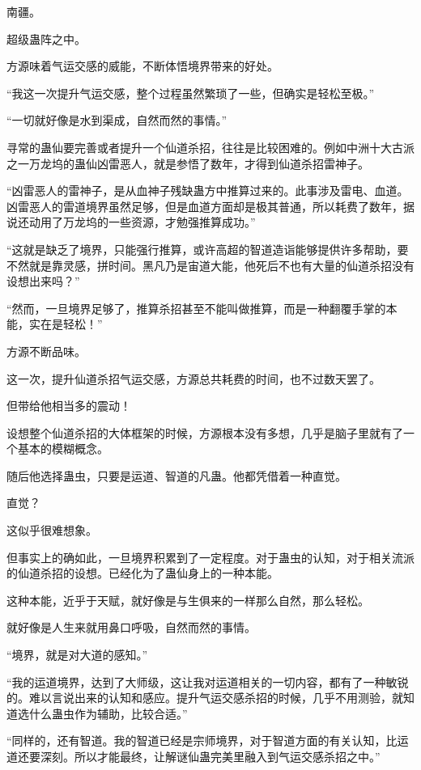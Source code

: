 
\begin{this_body}

南疆。

超级蛊阵之中。

方源味着气运交感的威能，不断体悟境界带来的好处。

“我这一次提升气运交感，整个过程虽然繁琐了一些，但确实是轻松至极。”

“一切就好像是水到渠成，自然而然的事情。”

寻常的蛊仙要完善或者提升一个仙道杀招，往往是比较困难的。例如中洲十大古派之一万龙坞的蛊仙凶雷恶人，就是参悟了数年，才得到仙道杀招雷神子。

“凶雷恶人的雷神子，是从血神子残缺蛊方中推算过来的。此事涉及雷电、血道。凶雷恶人的雷道境界虽然足够，但是血道方面却是极其普通，所以耗费了数年，据说还动用了万龙坞的一些资源，才勉强推算成功。”

“这就是缺乏了境界，只能强行推算，或许高超的智道造诣能够提供许多帮助，要不然就是靠灵感，拼时间。黑凡乃是宙道大能，他死后不也有大量的仙道杀招没有设想出来吗？”

“然而，一旦境界足够了，推算杀招甚至不能叫做推算，而是一种翻覆手掌的本能，实在是轻松！”

方源不断品味。

这一次，提升仙道杀招气运交感，方源总共耗费的时间，也不过数天罢了。

但带给他相当多的震动！

设想整个仙道杀招的大体框架的时候，方源根本没有多想，几乎是脑子里就有了一个基本的模糊概念。

随后他选择蛊虫，只要是运道、智道的凡蛊。他都凭借着一种直觉。

直觉？

这似乎很难想象。

但事实上的确如此，一旦境界积累到了一定程度。对于蛊虫的认知，对于相关流派的仙道杀招的设想。已经化为了蛊仙身上的一种本能。

这种本能，近乎于天赋，就好像是与生俱来的一样那么自然，那么轻松。

就好像是人生来就用鼻口呼吸，自然而然的事情。

“境界，就是对大道的感知。”

“我的运道境界，达到了大师级，这让我对运道相关的一切内容，都有了一种敏锐的。难以言说出来的认知和感应。提升气运交感杀招的时候，几乎不用测验，就知道选什么蛊虫作为辅助，比较合适。”

“同样的，还有智道。我的智道已经是宗师境界，对于智道方面的有关认知，比运道还要深刻。所以才能最终，让解谜仙蛊完美里融入到气运交感杀招之中。”


\end{this_body}
